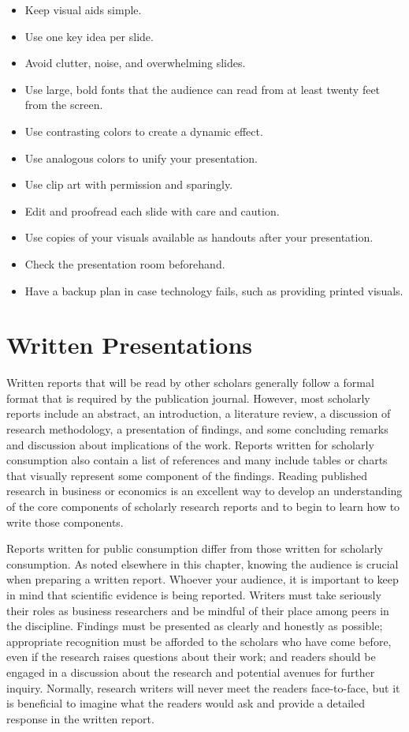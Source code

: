 \begin{itemize}
	\item Keep visual aids simple.
	\item Use one key idea per slide.
	\item Avoid clutter, noise, and overwhelming slides.
	\item Use large, bold fonts that the audience can read from at least twenty feet from the screen.
	\item Use contrasting colors to create a dynamic effect.
	\item Use analogous colors to unify your presentation.
	\item Use clip art with permission and sparingly.
	\item Edit and proofread each slide with care and caution.
	\item Use copies of your visuals available as handouts after your presentation.
	\item Check the presentation room beforehand.
	\item Have a backup plan in case technology fails, such as providing printed visuals.
\end{itemize}

\section{Written Presentations}

Written reports that will be read by other scholars generally follow a formal format that is required by the publication journal. However, most scholarly reports include an abstract, an introduction, a literature review, a discussion of research methodology, a presentation of findings, and some concluding remarks and discussion about implications of the work. Reports written for scholarly consumption also contain a list of references and many include tables or charts that visually represent some component of the findings. Reading published research in business or economics is an excellent way to develop an understanding of the core components of scholarly research reports and to begin to learn how to write those components.

Reports written for public consumption differ from those written for scholarly consumption. As noted elsewhere in this chapter, knowing the audience is crucial when preparing a written report. Whoever your audience, it is important to keep in mind that scientific evidence is being reported. Writers must take seriously their roles as business researchers and be mindful of their place among peers in the discipline. Findings must be presented as clearly and honestly as possible; appropriate recognition must be afforded to the scholars who have come before, even if the research raises questions about their work; and readers should be engaged in a discussion about the research and potential avenues for further inquiry. Normally, research writers will never meet the readers face-to-face, but it is beneficial to imagine what the readers would ask and provide a detailed response in the written report.

